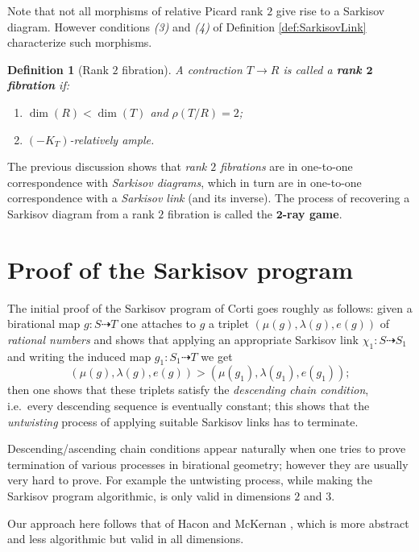 \documentclass[a4paper,11pt]{amsart}
\newtheorem{definition}[theorem]{Definition}
\def\dim{\operatorname{dim}}
\newcommand{\rmap}{\dashrightarrow}
\begin{document}
Note that not all morphisms of relative Picard rank $2$ give rise to a Sarkisov diagram.
However conditions \emph{(3)} and \emph{(4)} of Definition \ref{def:SarkisovLink} characterize such morphisms.

\begin{definition}[{Rank $2$ fibration}]
	A contraction $T \to R$ is called a \textbf{rank $\boldsymbol{2}$ fibration} if:
	\begin{enumerate}
		\item $\dim(R) < \dim(T)$ and $\rho(T/R) =2$;
		\item $(-K_T)$-relatively ample.
	\end{enumerate}
\end{definition}

The previous discussion shows that \emph{rank $2$ fibrations} are in one-to-one correspondence with \emph{Sarkisov diagrams}, which in turn are in one-to-one correspondence with a \emph{Sarkisov link} (and its inverse).
The process of recovering a Sarkisov diagram from a rank $2$ fibration is called the \textbf{$\boldsymbol{2}$-ray game}.



\section{Proof of the Sarkisov program}

The initial proof of the Sarkisov program of Corti \cite{Cor95} goes roughly as follows:
given a birational map $g\colon S \rmap T$ one attaches to $g$ a triplet $(\mu(g),\lambda(g),e(g))$ of \emph{rational numbers} and shows that applying an appropriate Sarkisov link $\chi_1\colon S \rmap S_1$ and writing the induced map $g_1 \colon S_1 \rmap T$ we get
\[
(\mu(g),\lambda(g),e(g)) > (\mu(g_1),\lambda(g_1),e(g_1));
\]
then one shows that these triplets satisfy the \emph{descending chain condition}, i.e.\ every descending sequence is eventually constant;
this shows that the \emph{untwisting} process of applying suitable Sarkisov links has to terminate.

Descending/ascending chain conditions appear naturally when one tries to prove termination of various processes in birational geometry;
however they are usually very hard to prove.
For example the untwisting process, while making the Sarkisov program algorithmic, is only valid in dimensions $2$ and $3$.

Our approach here follows that of Hacon and McKernan \cite{HM13}, which is more abstract and less algorithmic but valid in all dimensions.
\end{document}
